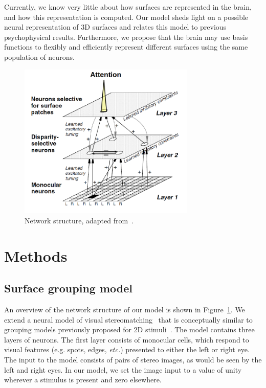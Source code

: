 Currently, we know very little about how surfaces are represented in the brain, and how this representation is computed. Our model sheds light on a possible neural representation of 3D surfaces and relates this model to previous psychophysical results. Furthermore, we propose that the brain may use basis functions to flexibly and efficiently represent different surfaces using the same population of neurons.

\begin{figure}[t]
\centering
\includegraphics[width=0.75\textwidth]{3D-Surface/figs/groupingcircuit}
\makeatletter
\let\@currsize\normalsize
\caption[3D surface grouping model network]{Network structure, adapted from~\citet{Marshall_etal96}.}
\label{NetworkStructure}
\end{figure}

\section{Methods}

\subsection{Surface grouping model}

An overview of the network structure of our model is shown in
Figure~\ref{NetworkStructure}. We extend a neural model of visual
stereomatching~\citep{Marshall_etal96} that is conceptually similar to
grouping models previously proposed for 2D stimuli~\citep{Craft_etal07, Mihalas_etal11b, Russell_etal14}. The model contains three layers of neurons. The first layer consists of monocular cells, which respond to visual features (e.g. spots, edges, {\em etc.}) presented to either the left or right eye. The input to the model consists of pairs of stereo images, as would be seen by the left and right eyes. In our model, we set the image input to a value of unity wherever a stimulus is present and zero elsewhere.

